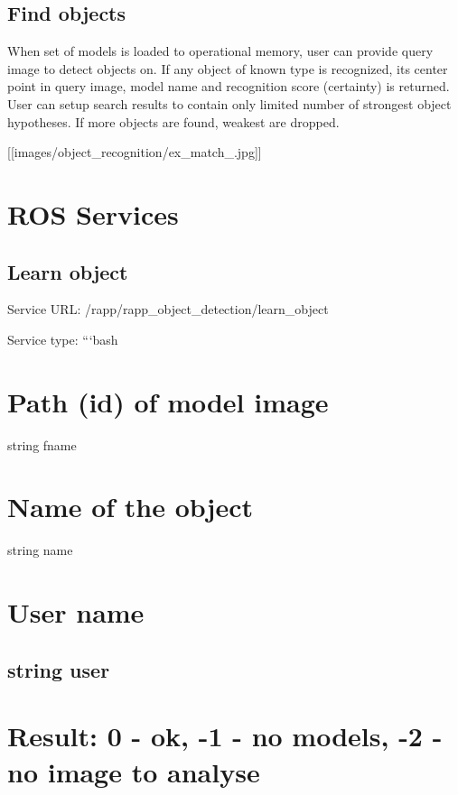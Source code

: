 \subsection*{Find objects}

When set of models is loaded to operational memory, user can provide query image to detect objects on. If any object of known type is recognized, its center point in query image, model name and recognition score (certainty) is returned. User can setup search results to contain only limited number of strongest object hypotheses. If more objects are found, weakest are dropped.

\mbox{[}\mbox{[}images/object\-\_\-recognition/ex\-\_\-match\-\_.\-jpg\mbox{]}\mbox{]}

\section*{R\-O\-S Services}

\subsection*{Learn object}

Service U\-R\-L\-: {\ttfamily /rapp/rapp\-\_\-object\-\_\-detection/learn\-\_\-object}

Service type\-: ```bash \section*{Path (id) of model image}

string fname \section*{Name of the object}

string name \section*{User name}

\subsection*{string user }

\section*{Result\-: 0 -\/ ok, -\/1 -\/ no models, -\/2 -\/ no image to analyse}

